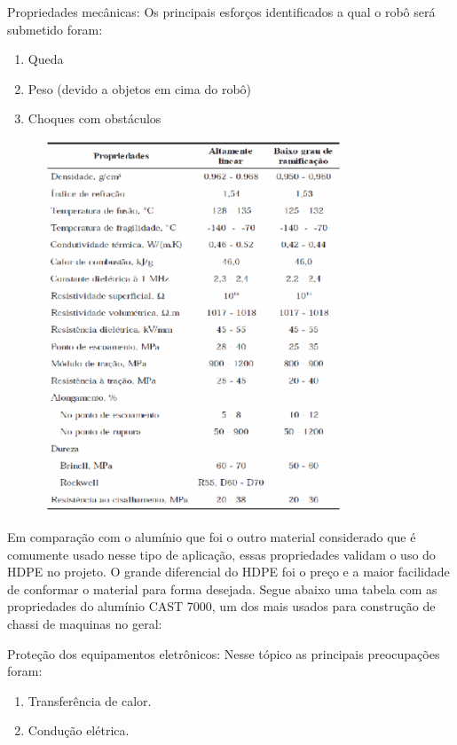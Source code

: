 Propriedades mecânicas: Os principais esforços identificados a qual o robô será submetido foram:
\begin{enumerate}
\item Queda
\item Peso (devido a objetos em cima do robô)
\item Choques com obstáculos
\end{enumerate}

\begin{figure}[H]
    \centering
    \includegraphics[width=0.8\textwidth]{figuras/tabela_pead.eps}
    \caption{}
    \label{fig:catia01}
\end{figure}

Em comparação com o alumínio que foi o outro material considerado que é comumente usado nesse tipo de aplicação, essas propriedades validam o uso do HDPE no projeto. O grande diferencial do HDPE foi o preço e a maior facilidade de conformar o material para forma desejada. Segue abaixo uma tabela com as propriedades do alumínio CAST 7000, um dos mais usados para construção de chassi de maquinas no geral:

Proteção dos equipamentos eletrônicos: Nesse tópico as principais preocupações foram:
\begin{enumerate}
\item Transferência de calor.
\item Condução elétrica.
\end{enumerate}

